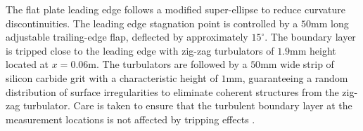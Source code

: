 The flat plate leading edge follows a modified super-ellipse \citep{Lin1992LEeffect} to reduce curvature discontinuities. The leading edge stagnation point is controlled by a $50\mathrm{mm}$ long adjustable trailing-edge flap, deflected by approximately $15^\circ$. The boundary layer is tripped close to the leading edge with zig-zag turbulators of $1.9\mathrm{mm}$ height located at $x = 0.06\mathrm{m}$. The turbulators are followed by a $50\mathrm{mm}$ wide strip of silicon carbide grit with a characteristic height of $1\mathrm{mm}$, guaranteeing a random distribution of surface irregularities to eliminate coherent structures from the zig-zag turbulator. Care is taken to ensure that the turbulent boundary layer at the measurement locations is not affected by tripping effects \citep{sanmiguel2017diagnostic}.

